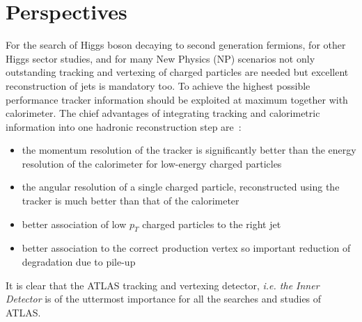 \chapter{Perspectives}


For the search of Higgs boson decaying to second generation fermions, for other Higgs sector 
studies, and for many New Physics (NP) scenarios not only outstanding tracking and vertexing of charged particles are needed but  excellent reconstruction of jets is mandatory  too. 
To achieve the highest possible performance tracker information should be exploited at maximum 
together with calorimeter. 
The chief advantages of integrating tracking and calorimetric information into one hadronic reconstruction
step are~\cite{ATLASParticleFlow}:

\begin{itemize}
\item the momentum resolution of the tracker is significantly better than the energy resolution of the
calorimeter for low-energy charged particles
\item the angular resolution of a single charged particle, reconstructed using the tracker is much better
than that of the calorimeter
\item better association of low $p_T$ charged particles to the right jet
\item better association to the correct production vertex so important reduction of degradation due to pile-up  
\end{itemize}

It is clear that the ATLAS tracking and vertexing detector, {\it i.e. the Inner Detector} is of the uttermost importance for all
the searches and studies of ATLAS.
